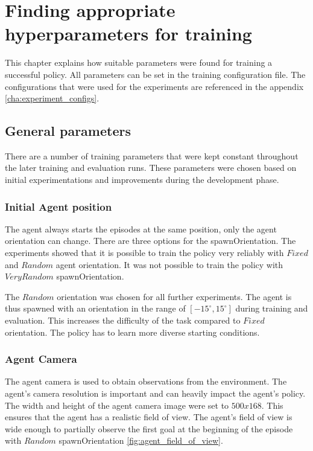 \chapter{Finding appropriate hyperparameters for training}
\label{cha:experiments_training_parameters}

This chapter explains how suitable parameters were found for training a successful policy. All parameters can be set in the training configuration file. The configurations that were used for the experiments are referenced in the appendix \ref{cha:experiment_configs}.


\section{General parameters}

There are a number of training parameters that were kept constant throughout the later training and evaluation runs. These parameters were chosen based on initial experimentations and improvements during the development phase.

\subsection{Initial Agent position}

The agent always starts the episodes at the same position, only the agent orientation can change. There are three options for the spawnOrientation. The experiments showed that it is possible to train the policy very reliably with $Fixed$ and $Random$ agent orientation. It was not possible to train the policy with $VeryRandom$ spawnOrientation.

The $Random$ orientation was chosen for all further experiments. The agent is thus spawned with an orientation in the range of $[-15^{\circ}, 15^{\circ}]$ during training and evaluation.
This increases the difficulty of the task compared to $Fixed$ orientation. The policy has to learn more diverse starting conditions.

\subsection{Agent Camera}

The agent camera is used to obtain observations from the environment. The agent's camera resolution is important and can heavily impact the agent's policy. The width and height of the agent camera image were set to $500x168$. This ensures that the agent has a realistic field of view. The agent's field of view is wide enough to partially observe the first goal at the beginning of the episode with $Random$ spawnOrientation \ref{fig:agent_field_of_view}.


